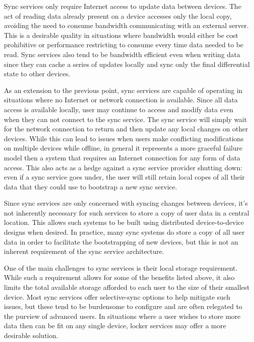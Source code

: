 \begin{packed_desc}
\item[Bandwidth Efficient:] Sync services only require Internet access
  to update data between devices. The act of reading data already
  present on a device accesses only the local copy, avoiding the need
  to consume bandwidth communicating with an external server. This is
  a desirable quality in situations where bandwidth would either be
  cost prohibitive or performance restricting to consume every time
  data needed to be read. Sync services also tend to be bandwidth
  efficient even when writing data since they can cache a series of
  updates locally and sync only the final differential state to other
  devices.
\item[Offline Support:] As an extension to the previous point, sync
  services are capable of operating in situations where no Internet or
  network connection is available. Since all data access is available
  locally, user may continue to access and modify data even when they
  can not connect to the sync service. The sync service will simply
  wait for the network connection to return and then update any local
  changes on other devices. While this can lead to issues when users
  make conflicting modifications on multiple devices while offline, in
  general it represents a more graceful failure model then a system
  that requires an Internet connection for any form of data
  access. This also acts as a hedge against a sync service provider
  shutting down: even if a sync service goes under, the user will
  still retain local copes of all their data that they could use to
  bootstrap a new sync service.
\item[No Central Storage:] Since sync services are only concerned with
  syncing changes between devices, it's not inherently necessary for
  such services to store a copy of user data in a central
  location. This allows such systems to be built using distributed
  device-to-device designs when desired. In practice, many sync
  systems do store a copy of all user data in order to facilitate the
  bootstrapping of new devices, but this is not an inherent
  requirement of the sync service architecture.
\end{packed_desc}

One of the main challenges to sync services is their local storage
requirement. While such a requirement allows for some of the benefits
listed above, it also limits the total available storage afforded to
each user to the size of their smallest device. Most sync services
offer selective-sync options to help mitigate such issues, but these
tend to be burdensome to configure and are often relegated to the
purview of advanced users. In situations where a user wishes to store
more data then can be fit on any single device, locker services may
offer a more desirable solution.

